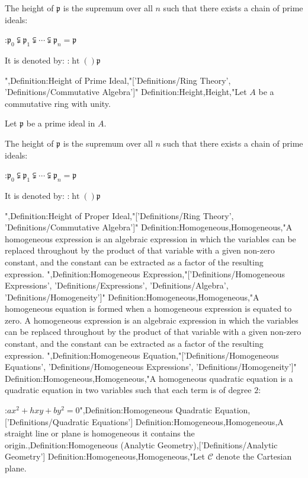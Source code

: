 The height of $\mathfrak p$ is the supremum over all $n$ such that there exists a chain of prime ideals:

:$\mathfrak p_0 \subsetneqq \mathfrak p_1 \subsetneqq \cdots \subsetneqq \mathfrak p_n = \mathfrak p$


It is denoted by:
:$\operatorname {ht}  \left(   \right){\mathfrak p}$

",Definition:Height of Prime Ideal,"['Definitions/Ring Theory', 'Definitions/Commutative Algebra']"
Definition:Height,Height,"Let $A$ be a commutative ring with unity.

Let $\mathfrak p$ be a prime ideal in $A$.


The height of $\mathfrak p$ is the supremum over all $n$ such that there exists a chain of prime ideals:

:$\mathfrak p_0 \subsetneqq \mathfrak p_1 \subsetneqq \cdots \subsetneqq \mathfrak p_n = \mathfrak p$


It is denoted by:
:$\operatorname {ht}  \left(   \right){\mathfrak p}$


",Definition:Height of Proper Ideal,"['Definitions/Ring Theory', 'Definitions/Commutative Algebra']"
Definition:Homogeneous,Homogeneous,"A homogeneous expression is an algebraic expression in which the variables can be replaced throughout by the product of that variable with a given non-zero constant, and the constant can be extracted as a factor of the resulting expression.
",Definition:Homogeneous Expression,"['Definitions/Homogeneous Expressions', 'Definitions/Expressions', 'Definitions/Algebra', 'Definitions/Homogeneity']"
Definition:Homogeneous,Homogeneous,"A homogeneous equation is formed when a homogeneous expression is equated to zero.
A homogeneous expression is an algebraic expression in which the variables can be replaced throughout by the product of that variable with a given non-zero constant, and the constant can be extracted as a factor of the resulting expression.
",Definition:Homogeneous Equation,"['Definitions/Homogeneous Equations', 'Definitions/Homogeneous Expressions', 'Definitions/Homogeneity']"
Definition:Homogeneous,Homogeneous,"A homogeneous quadratic equation is a quadratic equation in two variables such that each term is of degree $2$:

:$a x^2 + h x y + b y^2 = 0$",Definition:Homogeneous Quadratic Equation,['Definitions/Quadratic Equations']
Definition:Homogeneous,Homogeneous,A straight line or plane is homogeneous  it contains the origin.,Definition:Homogeneous (Analytic Geometry),['Definitions/Analytic Geometry']
Definition:Homogeneous,Homogeneous,"Let $\mathcal C$ denote the Cartesian plane.

